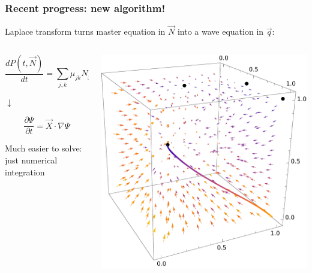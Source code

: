 \documentclass{beamer}
\begin{document}
\begin{frame}
    \frametitle{Recent progress: new algorithm!}

    Laplace transform turns master equation in $\vec{N}$ into a wave equation in
    $\vec{q}$:
    \begin{columns}
        \begin{column}{0.5\textwidth}
        \begin{equation*}
            \frac{d P(t,\vec{N})}{dt} = \sum_{j,k} \mu_{jk} N_j
            P(t,\vec{N}') + \cdots
        \end{equation*}
        \begin{center}
            $\downarrow$
        \end{center}
        \begin{equation*}
            \frac{\partial \Psi}{\partial t} = \vec{X}\cdot \nabla \Psi
        \end{equation*}

        Much easier to solve: just numerical integration
        \end{column}
        \begin{column}{0.5\textwidth}
        \includegraphics[width=\textwidth]{figures/flowcube1}
        \end{column}
    \end{columns}
\end{frame}
\end{document}
